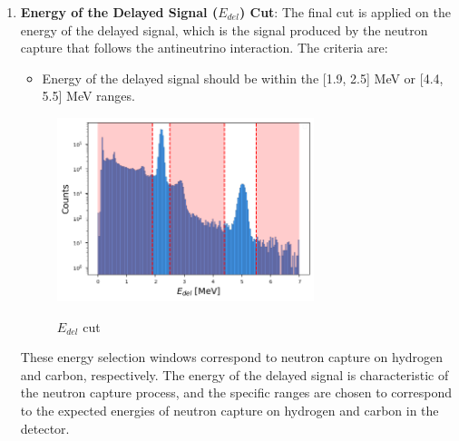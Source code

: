 \begin{enumerate}
	\item \textbf{Energy of the Delayed Signal ($E_{del}$) Cut}: The final cut is applied on the energy of the delayed signal, which is the signal produced by the neutron capture that follows the antineutrino interaction. The criteria are:
	\begin{itemize}
		\item Energy of the delayed signal should be within the [1.9, 2.5] MeV or [4.4, 5.5] MeV ranges.
	\end{itemize}
	
	\begin{adjustbox}{minipage={\linewidth}, valign=t}
		
		\begin{figure}
			
			\vspace{-1.5\baselineskip}
			\caption{$E_{del}$ cut}
			\vspace{-0.5\baselineskip}
			\includegraphics[width=7.5cm]{Images/Cut/e_del.png}
			\label{fig:e_del_cut}
			\vspace{-0.2\baselineskip}
			\vspace{-5\baselineskip}
			
		\end{figure}
		
		\vspace*{0.15em}
		
		These energy selection windows correspond to neutron capture on hydrogen and carbon, respectively. The energy of the delayed signal is characteristic of the neutron capture process, and the specific ranges are chosen to correspond to the expected energies of neutron capture on hydrogen and carbon in the detector.\\
		\\
		\newline
		\newline
		
	\end{adjustbox}

\end{enumerate}

